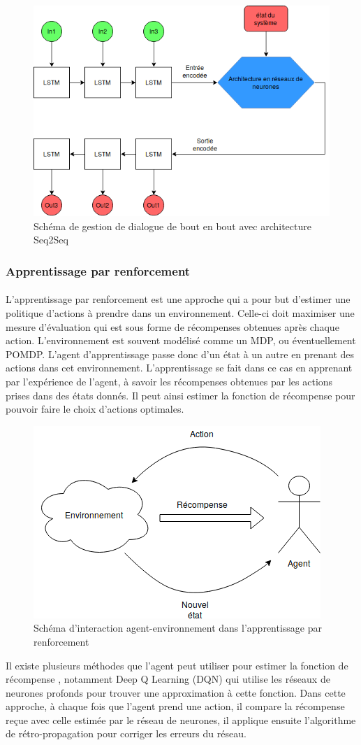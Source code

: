 \begin{figure}[H]
	\centering
	\includegraphics[width=.7\linewidth]{images/DM/DMSeq2Seq.png} 
	\caption{Schéma de gestion de dialogue de bout en bout avec architecture Seq2Seq} 
\end{figure}
\subsubsection{Apprentissage par renforcement} \label{reinf_learning}
\paragraph{}
L’apprentissage par renforcement est une approche qui a pour but d’estimer une politique d’actions à prendre dans un environnement. Celle-ci doit maximiser une mesure d’évaluation qui est sous forme de récompenses obtenues après chaque action\cite{Weisz2018}. L’environnement est souvent modélisé comme un MDP, ou éventuellement POMDP. L’agent d’apprentissage passe donc d’un état à un autre en prenant des actions dans cet environnement. L’apprentissage se fait dans ce cas en apprenant par l’expérience de l’agent, à savoir les récompenses obtenues par les actions prises dans des états donnés. Il peut ainsi estimer la fonction de récompense pour pouvoir faire le choix d’actions optimales. 

\begin{figure}[H]
	\centering
	\includegraphics[width=.5\linewidth]{images/DM/RLSchema.png} 
	\caption{Schéma d'interaction agent-environnement dans l'apprentissage par renforcement} 
\end{figure}
Il existe plusieurs méthodes que l’agent peut utiliser pour estimer la fonction de récompense \cite{Dimitri2012}, notamment Deep Q Learning (DQN) \cite{Mnih2015} qui utilise les réseaux de neurones profonds pour trouver une approximation à cette fonction. Dans cette approche, à chaque fois que l'agent prend une action, il compare la récompense reçue avec celle estimée par le réseau de neurones, il applique ensuite l'algorithme de rétro-propagation pour corriger les erreurs du réseau. 

